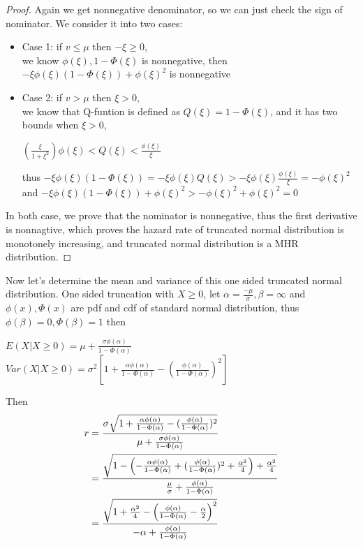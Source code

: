 \begin{proof}
Again we get nonnegative denominator, so we can just check the sign of nominator. We consider it into two cases:

\begin{itemize}
	\item Case 1: if $v \leqslant \mu$ then $-\xi \geqslant 0$,\\ we know $\phi(\xi), 1-\Phi(\xi)$ is nonnegative, then $-\xi\phi(\xi)\left( 1 - \Phi(\xi) \right) + \phi(\xi)^2$ is nonnegative
	\item Case 2: if  $v > \mu$ then $\xi > 0$, \\
	 we know that Q-funtion is defined as $Q(\xi) = 1- \Phi(\xi)$, and it has two bounds when $\xi > 0$,\begin{center}
	 	$\left( \frac{\xi}{1+\xi^2} \right)\phi(\xi) < Q(\xi) <\frac{\phi(\xi)}{\xi}$
	 \end{center}  thus  $-\xi\phi(\xi)\left( 1 - \Phi(\xi) \right) = -\xi\phi(\xi) Q(\xi)  > - \xi\phi(\xi)\frac{\phi(\xi)}{\xi} = -\phi(\xi)^2$ \\ and  $-\xi\phi(\xi)\left( 1 - \Phi(\xi) \right) + \phi(\xi)^2 > -\phi(\xi)^2 + \phi(\xi)^2 = 0$
\end{itemize}
 In both case, we prove that the nominator is nonnegative, thus the first derivative is nonnagtive, which proves the hazard rate of truncated normal distribution is monotonely increasing, and truncated normal distribution is a MHR distribution. 
\end{proof}

Now let's determine the mean and variance of this one sided truncated normal distribution.
One sided truncation with $X \geqslant 0$, let $\alpha = \frac{- \mu}{\sigma}, \beta = \infty$ and $\phi(x), \Phi(x) $ are pdf and cdf of standard normal distribution, thus $\phi(\beta) = 0, \Phi(\beta) = 1$ then 

\begin{center}
	$E(X | X \geqslant 0) = \mu + \frac{\sigma \phi(\alpha)}{1 - \Phi(\alpha)}$\\
	$Var( X | X \geqslant 0) = \sigma^2 [1+\frac{\alpha \phi(\alpha)}{1 - \Phi(\alpha)}-(\frac{ \phi(\alpha)}{1 - \Phi(\alpha)})^2]$
\end{center}
Then 
\begin{equation}\notag
	\begin{split}
		r &= \frac{\sigma \sqrt{1+\frac{\alpha \phi(\alpha)}{1 - \Phi(\alpha)}-(\frac{ \phi(\alpha)}{1 - \Phi(\alpha)})^2}}{ \mu + \frac{\sigma \phi(\alpha)}{1 - \Phi(\alpha)}} \\&=  \frac{ \sqrt{1-\left(-\frac{\alpha \phi(\alpha)}{1 - \Phi(\alpha)}+(\frac{ \phi(\alpha)}{1 - \Phi(\alpha)})^2 + \frac{\alpha^2}{4}\right) +\frac{\alpha^2}{4} }}{ \frac{\mu}{\sigma} + \frac{ \phi(\alpha)}{1 - \Phi(\alpha)}} \\&= \frac{ \sqrt{1+\frac{\alpha^2}{4}-\left(\frac{ \phi(\alpha)}{1 - \Phi(\alpha)}- \frac{\alpha}{2}\right)^2  }}{ -\alpha + \frac{ \phi(\alpha)}{1 - \Phi(\alpha)}}
	\end{split}
\end{equation} 

